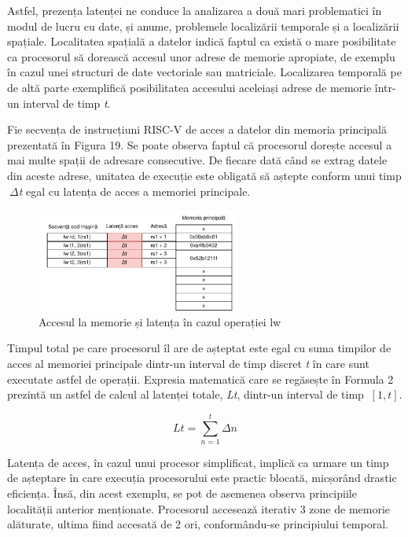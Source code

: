 \documentclass[12pt]{article}
\begin{document}
Astfel, prezența latenței ne conduce la analizarea a două mari problematici în modul de lucru cu date, și anume, problemele localizării temporale și a localizării spațiale. Localitatea spațială a datelor indică faptul ca există o mare posibilitate ca procesorul să dorească accesul unor adrese de memorie apropiate, de exemplu în cazul unei structuri de date vectoriale sau matriciale. Localizarea temporală pe de altă parte exemplifică posibilitatea accesului aceleiași adrese de memorie într-un interval de timp \textit{t}.

Fie secvența de instrucțiuni RISC-V de acces a datelor din memoria principală prezentată în Figura 19. Se poate observa faptul că procesorul dorește accesul a mai multe spații de adresare consecutive. De fiecare dată când se extrag datele din aceste adrese, unitatea de execuție este obligată să aștepte conform unui timp \textit{$\ {\Delta}$t} egal cu latența de acces a memoriei principale.

 \begin{figure}[h!]
 \includegraphics[width=0.6\textwidth]{cachememoryacces.pdf}
 \centering
 \caption{Accesul la memorie și latența în cazul operației lw}
 \label{Figura:40}
 \end{figure}
 
Timpul total pe care procesorul îl are de așteptat este egal cu suma timpilor de acces al memoriei principale dintr-un interval de timp discret \textit{t} în care sunt executate astfel de operații. Expresia matematică care se regăsește în Formula 2 prezintă un astfel de calcul al latenței totale, \textit{Lt}, dintr-un interval de timp $\ [1, t] $.
 
 \begin{equation}
\label{Formula:1}
Lt = \sum_{n=1}^{t} \Delta n
\end{equation}

Latența de acces, în cazul unui procesor simplificat, implică ca urmare un timp de așteptare în care execuția procesorului este practic blocată, micșorând drastic eficiența. Însă, din acest exemplu, se pot de asemenea observa principiile localității anterior menționate. Procesorul accesează iterativ 3 zone de memorie alăturate, ultima fiind accesată de 2 ori, conformându-se principiului temporal.
\end{document}
